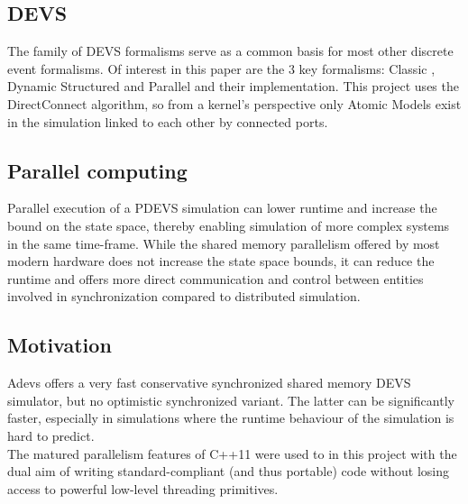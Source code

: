 \subsection{DEVS}
The family of DEVS \cite{DEVSbase} formalisms serve as a common basis for most other discrete event formalisms. Of interest in this paper are the 3 key formalisms: Classic \cite{ClassicDEVS}, Dynamic Structured \cite{DSDEVS} and Parallel \cite{ParallelDEVS} and their implementation. This project uses the DirectConnect \cite{SymbolicFlattening} algorithm, so from a kernel's perspective only Atomic Models exist in the simulation linked to each other by connected ports.

\subsection{Parallel computing}
Parallel execution of a PDEVS simulation can lower runtime and increase the bound on the state space, thereby enabling simulation of more complex systems in the same time-frame.
While the shared memory parallelism offered by most modern hardware does not increase the state space bounds, it can reduce the runtime and offers more direct communication and control between entities involved in synchronization compared to distributed simulation. \\

\subsection{Motivation}
Adevs \cite{adevs} offers a very fast conservative synchronized shared memory DEVS simulator, but no optimistic synchronized variant. 
The latter can be significantly faster, especially in simulations where the runtime behaviour of the simulation is hard to predict. \\
The matured parallelism features of C++11 were used to in this project with the dual aim of writing standard-compliant (and thus portable) code without losing access to powerful low-level threading primitives. %

